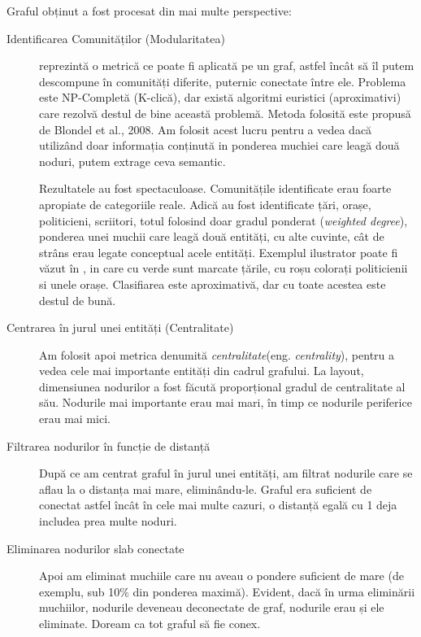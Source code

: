 Graful obținut a fost procesat din mai multe perspective:

\begin{description}

\item[Identificarea Comunităților (Modularitatea)] reprezintă o metrică ce poate fi aplicată pe un graf, astfel încât să îl putem descompune în comunități diferite, puternic conectate între ele. Problema este NP-Completă (K-clică), dar există algoritmi euristici (aproximativi) care rezolvă destul de bine această problemă. Metoda folosită este propusă de Blondel et al., 2008.\cite{Blondel08fastunfolding} Am folosit acest lucru pentru a vedea dacă utilizând doar informația conținută in ponderea muchiei care leagă două noduri, putem extrage ceva semantic.

Rezultatele au fost spectaculoase. Comunitățile identificate erau foarte apropiate de categoriile reale. Adică au fost identificate țări, orașe, politicieni, scriitori, totul folosind doar gradul ponderat (\textit{weighted degree}), ponderea unei muchii care leagă două entități, cu alte cuvinte, cât de strâns erau legate conceptual acele entități. Exemplul ilustrator poate fi văzut în , in care cu verde sunt marcate țările, cu roșu colorați politicienii si unele orașe. Clasifiarea este aproximativă, dar cu toate acestea este destul de bună.
 

 \item[Centrarea în jurul unei entități (Centralitate)] Am folosit apoi metrica denumită \textit{centralitate}(eng. \textit{centrality}), pentru a vedea cele mai importante entități din cadrul grafului. La layout, dimensiunea nodurilor a fost făcută proporțional gradul de centralitate al său. Nodurile mai importante erau mai mari, în timp ce nodurile periferice erau mai mici.
 
 \item[Filtrarea nodurilor în funcție de distanță] După ce am centrat graful în jurul unei entități, am filtrat nodurile care se aflau la o distanța mai mare, eliminându-le. Graful era suficient de conectat astfel încât în cele mai multe cazuri, o distanță egală cu 1 deja includea prea multe noduri.
 
 \item[Eliminarea nodurilor slab conectate] Apoi am eliminat muchiile care nu aveau o pondere suficient de mare (de exemplu, sub 10\% din ponderea maximă). Evident, dacă în urma eliminării muchiilor, nodurile deveneau deconectate de graf, nodurile erau și ele eliminate. Doream ca tot graful să fie conex.
 

\end{description}
